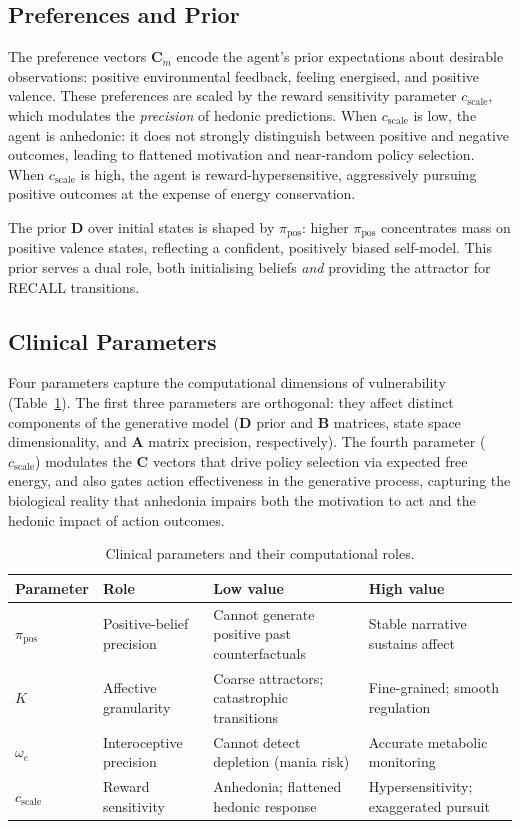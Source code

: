 \documentclass[11pt,a4paper]{article}
\begin{document}
\subsection{Preferences and Prior}

The preference vectors $\mathbf{C}_m$ encode the agent's prior expectations about desirable observations: positive environmental feedback, feeling energised, and positive valence. These preferences are scaled by the reward sensitivity parameter $c_{\text{scale}}$, which modulates the \emph{precision} of hedonic predictions. When $c_{\text{scale}}$ is low, the agent is anhedonic: it does not strongly distinguish between positive and negative outcomes, leading to flattened motivation and near-random policy selection. When $c_{\text{scale}}$ is high, the agent is reward-hypersensitive, aggressively pursuing positive outcomes at the expense of energy conservation.

The prior $\mathbf{D}$ over initial states is shaped by $\pi_{\text{pos}}$: higher $\pi_{\text{pos}}$ concentrates mass on positive valence states, reflecting a confident, positively biased self-model. This prior serves a dual role, both initialising beliefs \emph{and} providing the attractor for RECALL transitions.

\subsection{Clinical Parameters}

Four parameters capture the computational dimensions of vulnerability (Table~\ref{tab:params}). The first three parameters are orthogonal: they affect distinct components of the generative model ($\mathbf{D}$ prior and $\mathbf{B}$ matrices, state space dimensionality, and $\mathbf{A}$ matrix precision, respectively). The fourth parameter ($c_{\text{scale}}$) modulates the $\mathbf{C}$ vectors that drive policy selection via expected free energy, and also gates action effectiveness in the generative process, capturing the biological reality that anhedonia impairs both the motivation to act and the hedonic impact of action outcomes.

\begin{table}[htbp]
\centering
\begin{tabular}{llll}
\toprule
\textbf{Parameter} & \textbf{Role} & \textbf{Low value} & \textbf{High value} \\
\midrule
$\pi_{\text{pos}}$ & Positive-belief precision & Cannot generate positive past counterfactuals & Stable narrative sustains affect \\
$K$ & Affective granularity & Coarse attractors; catastrophic transitions & Fine-grained; smooth regulation \\
$\omega_e$ & Interoceptive precision & Cannot detect depletion (mania risk) & Accurate metabolic monitoring \\
$c_{\text{scale}}$ & Reward sensitivity & Anhedonia; flattened hedonic response & Hypersensitivity; exaggerated pursuit \\
\bottomrule
\end{tabular}
\caption{Clinical parameters and their computational roles.}
\label{tab:params}
\end{table}
\end{document}
